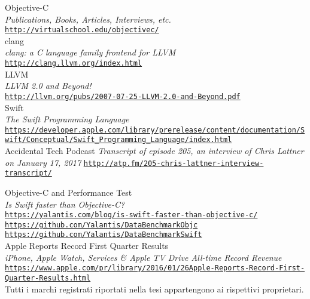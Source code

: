 \cleardoublepage
{}
{}
\begin{thebibliography}{}

 Objective-C\\
  \emph{Publications, Books, Articles, Interviews, etc.} \\
  \footnotesize \texttt{\url{http://virtualschool.edu/objectivec/}} \\
  
 clang\\
  \emph{clang: a C language family frontend for LLVM} \\
  \footnotesize \texttt{\url{http://clang.llvm.org/index.html}} \\
  
 LLVM\\
 \emph{LLVM 2.0 and Beyond!} \\
  \footnotesize \texttt{\url{http://llvm.org/pubs/2007-07-25-LLVM-2.0-and-Beyond.pdf}} \\
  
 Swift\\
 \emph{The Swift Programming Language} \\
  \footnotesize \texttt{\url{https://developer.apple.com/library/prerelease/content/documentation/Swift/Conceptual/Swift_Programming_Language/index.html}} 
 \\
 
  Accidental Tech Podcast
 \emph{Transcript of episode 205, an interview of Chris Lattner on January 17, 2017}
 \footnotesize
 \texttt{\url{http://atp.fm/205-chris-lattner-interview-transcript/}}
  
  
 Objective-C and Performance Test\\
\emph{Is Swift faster than Objective-C?}\\
\footnotesize
\texttt{\url{https://yalantis.com/blog/is-swift-faster-than-objective-c/}}
\texttt{\url{https://github.com/Yalantis/DataBenchmarkObjc}}
\texttt{\url{https://github.com/Yalantis/DataBenchmarkSwift}}
 \\
 
  Apple Reports Record First Quarter Results\\
 \emph{iPhone, Apple Watch, Services \& Apple TV Drive All-time Record Revenue}\\
 \footnotesize
 \texttt{\url{https://www.apple.com/pr/library/2016/01/26Apple-Reports-Record-First-Quarter-Results.html}}\\

Tutti i marchi registrati riportati nella tesi appartengono ai rispettivi proprietari.
\end{thebibliography}

